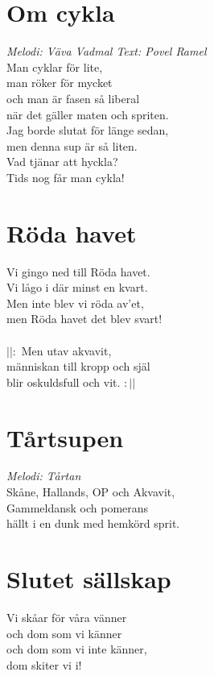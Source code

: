 \section{Om cykla}
\textit{Melodi: Väva Vadmal \vspace{5mm} Text: Povel Ramel}
\vspace{2mm}\\
Man cyklar för lite,\\
man röker för mycket \\
och man är fasen så liberal\\
när det gäller maten och spriten.\\
Jag borde slutat för länge sedan,\\
men denna sup är så liten.\\
Vad tjänar att hyckla? \\
Tids nog får man cykla!\\

\section{Röda havet}
Vi gingo ned till Röda havet.\\
Vi lågo i där minst en kvart.\\
Men inte blev vi röda av'et,\\
men Röda havet det blev svart! \\
\\
$||:$ Men utav akvavit,\\
människan till kropp och själ\\
blir oskuldsfull och vit. $:||$\\

\section{Tårtsupen}
\textit{Melodi: Tårtan}
\vspace{2mm}\\
Skåne, Hallands, OP och Akvavit,\\
Gammeldansk och pomerans\\
hällt i en dunk med hemkörd sprit.\\

\section{Slutet sällskap}
Vi skåar för våra vänner\\
och dom som vi känner\\
och dom som vi inte känner,\\
dom skiter vi i!\\

